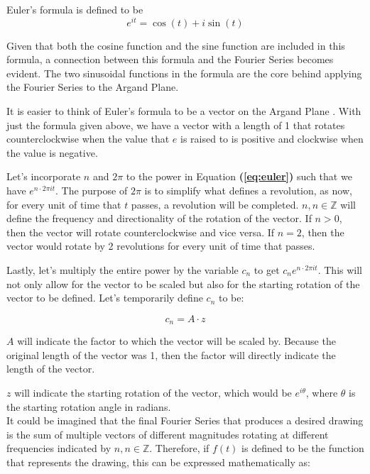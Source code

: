 \documentclass[letterpaper, 12pt]{article}
\begin{document}
Euler's formula is defined to be
\begin{equation}
    e^{it} = \cos(t) + i\sin(t)
    \label{eq:euler}
\end{equation}

Given that both the cosine function and the sine function are included in this
formula, a connection between this formula and the Fourier Series becomes evident.
The two sinusoidal functions in the formula are the core behind applying the
Fourier Series to the Argand Plane.

It is easier to think of Euler's formula to be a vector on the Argand Plane \cite{sandersonWhatFourierSeries2019}.
With just the formula given above, we have a vector with a length of 1 that rotates
counterclockwise when the value that \(e\) is raised to is positive and
clockwise when the value is negative.

Let's incorporate \(n\) and \(2\pi\) to the power in Equation \textbf{(\ref*{eq:euler})} such
that we have \(e^{n \cdot 2\pi it}\). The purpose of \(2\pi\) is to
simplify what defines a revolution, as now, for every unit of time that
\(t\) passes, a revolution will be completed. \(n, n \in \mathbb{Z}\) will define the frequency
and directionality of the rotation of the vector. If \(n > 0\), then the vector
will rotate counterclockwise and vice versa. If \(n = 2\), then the vector would
rotate by 2 revolutions for every unit of time that passes.

Lastly, let's multiply the entire power by the variable \(c_n\) to get \(c_n e^{n \cdot 2\pi it}\). This will not
only allow for the vector to be scaled but also for the starting rotation of
the vector to be defined. Let's temporarily define \(c_n\) to be:

\begin{equation*}
    c_n = A \cdot z
\end{equation*}

\(A\) will indicate the factor to which the vector will be scaled by. Because
the original length of the vector was 1, then the factor will directly indicate
the length of the vector.

\(z\) will indicate the starting rotation of the vector, which would be
\(e^{i\theta}\), where \(\theta\) is the starting rotation angle in radians.
\\

It could be imagined that the final Fourier Series that produces a desired drawing
is the sum of multiple vectors of different magnitudes rotating at different frequencies
indicated by \(n, n \in \mathbb{Z}\). Therefore, if \(f(t)\) is defined to be the
function that represents the drawing, this can be expressed mathematically
as:
\end{document}
